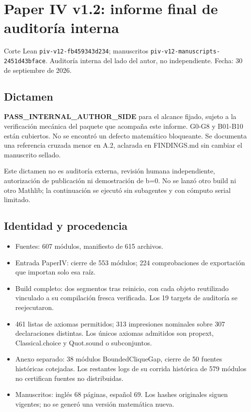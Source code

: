 \documentclass[11pt]{article}
\providecommand{\tightlist}{\setlength{\itemsep}{0pt}\setlength{\parskip}{0pt}}
\begin{document}
\section{Paper IV v1.2: informe final de auditoría
interna}\label{paper-iv-v1.2-informe-final-de-auditoruxeda-interna}

Corte Lean \nolinkurl{piv-v12-fb459343d234}; manuscritos
\nolinkurl{piv-v12-manuscripts-2451d43bface}. Auditoría interna del lado
del autor, no independiente. Fecha: 30 de septiembre de 2026.

\subsection{Dictamen}\label{dictamen}

\textbf{PASS\_INTERNAL\_AUTHOR\_SIDE} para el alcance fijado, sujeto a
la verificación mecánica del paquete que acompaña este informe. G0-G8 y
B01-B10 están cubiertos. No se encontró un defecto matemático
bloqueante. Se documenta una referencia cruzada menor en A.2, aclarada
en FINDINGS.md sin cambiar el manuscrito sellado.

Este dictamen no es auditoría externa, revisión humana independiente,
autorización de publicación ni demostración de b=0. No se lanzó otro
build ni otro Mathlib; la continuación se ejecutó sin subagentes y con
cómputo serial limitado.

\subsection{Identidad y procedencia}\label{identidad-y-procedencia}

\begin{itemize}
\tightlist
\item
  Fuentes: 607 módulos, manifiesto de 615 archivos.
\item
  Entrada PaperIV: cierre de 553 módulos; 224 comprobaciones de
  exportación que importan solo esa raíz.
\item
  Build completo: dos segmentos tras reinicio, con cada objeto
  reutilizado vinculado a su compilación fresca verificada. Los 19
  targets de auditoría se reejecutaron.
\item
  461 listas de axiomas permitidos; 313 impresiones nominales sobre 307
  declaraciones distintas. Los únicos axiomas admitidos son propext,
  Classical.choice y Quot.sound o subconjuntos.
\item
  Anexo separado: 38 módulos BoundedCliqueGap, cierre de 50 fuentes
  históricas cotejadas. Los restantes logs de su corrida histórica de
  579 módulos no certifican fuentes no distribuidas.
\item
  Manuscritos: inglés 68 páginas, español 69. Los hashes originales
  siguen vigentes; no se generó una versión matemática nueva.
\end{itemize}
\end{document}
